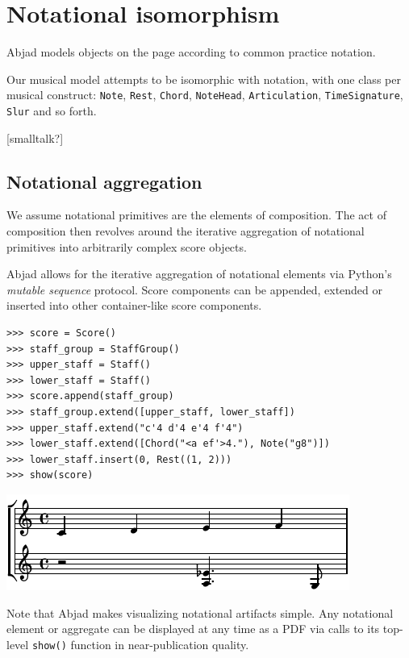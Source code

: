 \section{Notational isomorphism}\label{sec:notational_isomorphism}

Abjad models objects on the page according to common practice notation.

Our musical model attempts to be isomorphic with notation, with one class per
musical construct: \texttt{Note}, \texttt{Rest}, \texttt{Chord},
\texttt{NoteHead}, \texttt{Articulation}, \texttt{TimeSignature}, \texttt{Slur}
and so forth.

[smalltalk?]

\subsection{Notational aggregation}

We assume notational primitives are the elements of composition. The act of
composition then revolves around the iterative aggregation of notational
primitives into arbitrarily complex score objects.

Abjad allows for the iterative aggregation of notational elements via Python's
\emph{mutable sequence} protocol. Score components can be appended, extended or
inserted into other container-like score components.

\begin{lstlisting}
>>> score = Score()
>>> staff_group = StaffGroup()
>>> upper_staff = Staff()
>>> lower_staff = Staff()
>>> score.append(staff_group)
>>> staff_group.extend([upper_staff, lower_staff])
>>> upper_staff.extend("c'4 d'4 e'4 f'4")
>>> lower_staff.extend([Chord("<a ef'>4."), Note("g8")])
>>> lower_staff.insert(0, Rest((1, 2)))
>>> show(score)
\end{lstlisting}

\includegraphics[scale=1.0]{images/section_2_notational_isomorphism-1.pdf}


Note that Abjad makes visualizing notational artifacts simple. Any notational
element or aggregate can be displayed at any time as a PDF via calls to its
top-level \texttt{show()} function in near-publication quality.

